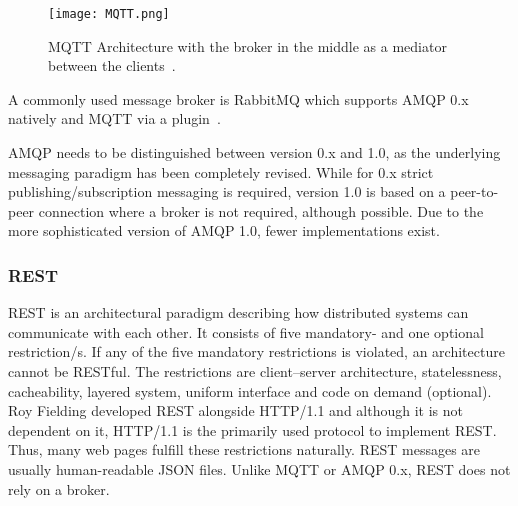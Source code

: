 \begin{figure}[ht]
	\centering
  \texttt{[image: MQTT.png]}
	\caption[MQTT Architecture]{MQTT Architecture with the broker in the middle as a mediator between the clients~\cite{1Sheeld2018Pure-javascript-MQTT-broker.2018}.}
	\label{MQTT}
\end{figure}

A commonly used message broker is RabbitMQ which supports AMQP 0.x natively and MQTT via a plugin~\cite{RabittMQ-Documentation2018Which2018}.

AMQP needs to be distinguished between version 0.x and 1.0, as the underlying messaging paradigm has been completely revised. While for 0.x strict publishing/subscription messaging is required, version 1.0 is based on a peer-to-peer connection where a broker is not required, although possible. Due to the more sophisticated version of AMQP 1.0, fewer implementations exist.~\cite{Dizdarevic2019AIntegration}

\subsubsection{REST}
REST is an architectural paradigm describing how distributed systems can communicate with each other. It consists of five mandatory- and one optional restriction/s. If any of the five mandatory restrictions is violated, an architecture cannot be RESTful. The restrictions are client–server architecture, statelessness, cacheability, layered system, uniform interface and code on demand (optional). Roy Fielding developed REST alongside HTTP/1.1 and although it is not dependent on it, HTTP/1.1 is the primarily used protocol to implement REST. Thus, many web pages fulfill these restrictions naturally. REST messages are usually human-readable JSON files. Unlike MQTT or AMQP 0.x, REST does not rely on a broker.~\cite{Fielding2000ArchitecturalArchitectures}


